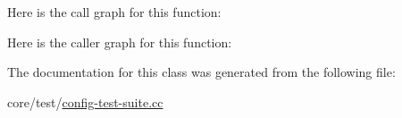Here is the call graph for this function\+:




Here is the caller graph for this function\+:




The documentation for this class was generated from the following file\+:\begin{DoxyCompactItemize}
\item 
core/test/\hyperlink{config-test-suite_8cc}{config-\/test-\/suite.\+cc}\end{DoxyCompactItemize}
